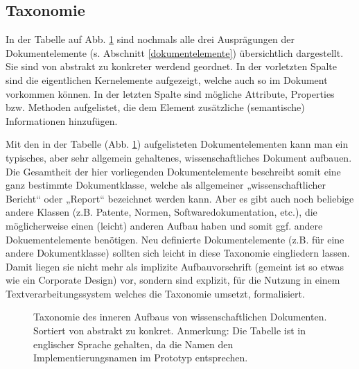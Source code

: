  
\subsection{Taxonomie}\label{taxonomiesec}
 
In der Tabelle auf Abb. \ref{taxonomie} sind nochmals alle drei Ausprägungen der Dokumentelemente (s. Abschnitt \ref{dokumentelemente}) übersichtlich dargestellt. Sie sind von abstrakt zu konkreter werdend geordnet. In der vorletzten Spalte sind die eigentlichen Kernelemente aufgezeigt, welche auch so im Dokument vorkommen können. In der letzten Spalte sind mögliche Attribute, Properties bzw. Methoden aufgelistet, die dem Element zusätzliche (semantische) Informationen hinzufügen.

 
Mit den in der Tabelle (Abb. \ref{taxonomie}) aufgelisteten Dokumentelementen kann man ein typisches, aber sehr allgemein gehaltenes, wissenschaftliches Dokument aufbauen. Die Gesamtheit der hier vorliegenden Dokumentelemente beschreibt somit eine ganz bestimmte Dokumentklasse, welche als allgemeiner „wissenschaftlicher Bericht“ oder „Report“ bezeichnet werden kann. Aber es gibt auch noch beliebige andere Klassen (z.B. Patente, Normen, Softwaredokumentation, etc.), die möglicherweise einen (leicht) anderen Aufbau haben und somit ggf. andere Dokuementelemente benötigen. Neu definierte Dokumentelemente (z.B. für eine andere Dokumentklasse) sollten sich leicht in diese Taxonomie eingliedern lassen. Damit liegen sie nicht mehr als implizite Aufbauvorschrift (gemeint ist so etwas wie ein Corporate Design) vor, sondern sind explizit, für die Nutzung in einem Textverarbeitungssystem welches die Taxonomie umsetzt, formalisiert.

 
\begin{figure}[h!]
\centering
{}
\caption[Taxonomie über den inneren Dokumentenaufbau]{ Taxonomie des inneren Aufbaus von wissenschaftlichen Dokumenten. Sortiert von abstrakt zu konkret. Anmerkung: Die Tabelle ist in englischer Sprache gehalten, da die Namen den Implementierungsnamen im Prototyp entsprechen. }\label{taxonomie}
\end{figure}
 
